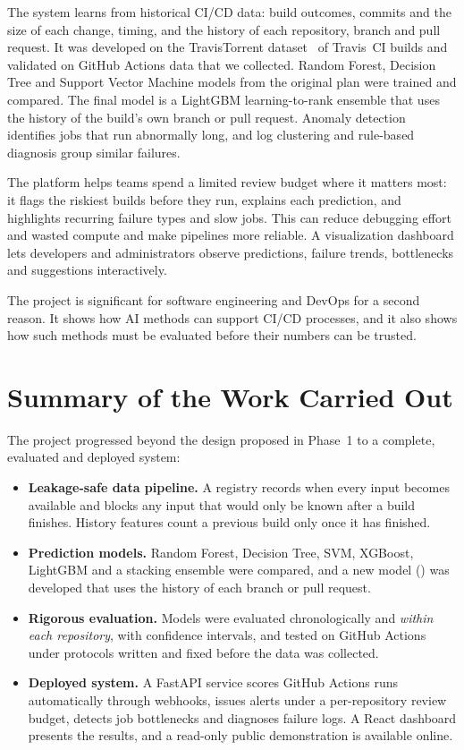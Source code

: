The system learns from historical CI/CD data: build outcomes, commits and the size of each change, timing, and the history of each repository, branch and pull request. It was developed on the TravisTorrent dataset~\cite{beller2017travistorrent} of Travis~CI builds and validated on GitHub Actions data that we collected. Random Forest, Decision Tree and Support Vector Machine models from the original plan were trained and compared. The final model is a LightGBM learning-to-rank ensemble that uses the history of the build's own branch or pull request. Anomaly detection identifies jobs that run abnormally long, and log clustering and rule-based diagnosis group similar failures.

The platform helps teams spend a limited review budget where it matters most: it flags the riskiest builds before they run, explains each prediction, and highlights recurring failure types and slow jobs. This can reduce debugging effort and wasted compute and make pipelines more reliable. A visualization dashboard lets developers and administrators observe predictions, failure trends, bottlenecks and suggestions interactively.

The project is significant for software engineering and DevOps for a second reason. It shows how AI methods can support CI/CD processes, and it also shows how such methods must be evaluated before their numbers can be trusted.

\section{Summary of the Work Carried Out}
\label{sec:summarywork}
The project progressed beyond the design proposed in Phase~1 to a complete, evaluated and deployed system:
\begin{itemize}
\item \textbf{Leakage-safe data pipeline.} A registry records when every input becomes available and blocks any input that would only be known after a build finishes. History features count a previous build only once it has finished.
\item \textbf{Prediction models.} Random Forest, Decision Tree, SVM, XGBoost, LightGBM and a stacking ensemble were compared, and a new model (\tierE) was developed that uses the history of each branch or pull request.
\item \textbf{Rigorous evaluation.} Models were evaluated chronologically and \emph{within each repository}, with confidence intervals, and tested on GitHub Actions under protocols written and fixed before the data was collected.
\item \textbf{Deployed system.} A FastAPI service scores GitHub Actions runs automatically through webhooks, issues alerts under a per-repository review budget, detects job bottlenecks and diagnoses failure logs. A React dashboard presents the results, and a read-only public demonstration is available online.
\end{itemize}

